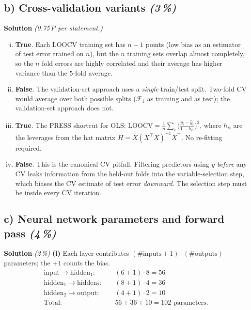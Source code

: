 \documentclass[11pt,a4paper]{article}
\newcommand{\subpoints}[1]{\textit{(#1\,\%)}}
\newcommand{\sol}{\noindent\textbf{Solution}}
\begin{document}
\subsection*{b) Cross-validation variants \subpoints{3}}
\sol{} \emph{(0.75\,P per statement.)}
\begin{enumerate}[(i)]
  \item \textbf{True}. Each LOOCV training set has $n-1$ points (low bias as an estimator of test
        error trained on $n$), but the $n$ training sets overlap almost completely, so the $n$
        fold errors are highly correlated and their average has higher variance than the
        $5$-fold average.
  \item \textbf{False}. The validation-set approach uses a \emph{single} train/test split. Two-fold
        CV would average over both possible splits ($\mathcal{F}_1$ as training and as test); the
        validation-set approach does not.
  \item \textbf{True}. The PRESS shortcut for OLS:
        $\mathrm{LOOCV} = \frac{1}{n}\sum_i \bigl(\frac{y_i-\hat y_i}{1-h_{ii}}\bigr)^2$,
        where $h_{ii}$ are the leverages from the hat matrix $H = X(X^\top X)^{-1}X^\top$.
        No re-fitting required.
  \item \textbf{False}. This is the canonical CV pitfall. Filtering predictors using $y$ \emph{before}
        any CV leaks information from the held-out folds into the variable-selection step, which
        biases the CV estimate of test error \emph{downward}. The selection step must be inside
        every CV iteration.
\end{enumerate}

\subsection*{c) Neural network parameters and forward pass \subpoints{4}}

\sol{} \subpoints{2} \textbf{(i)} Each layer contributes $(\text{\#inputs}+1)\cdot(\text{\#outputs})$
parameters; the $+1$ counts the bias.
\begin{align*}
\text{input}\to\text{hidden}_1: & \quad (6+1)\cdot 8 = 56 \\
\text{hidden}_1\to\text{hidden}_2: & \quad (8+1)\cdot 4 = 36 \\
\text{hidden}_2\to\text{output}: & \quad (4+1)\cdot 2 = 10 \\
\text{Total:} & \quad \boxed{56+36+10 = 102} \text{ parameters.}
\end{align*}
\end{document}
